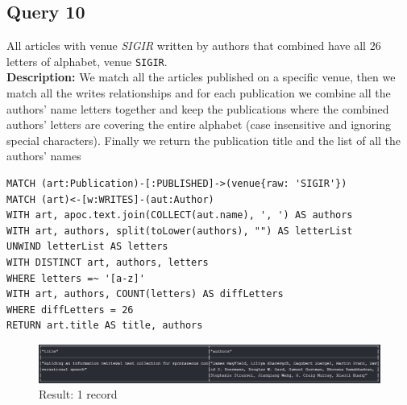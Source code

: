 \documentclass{Configuration_Files/PoliMi3i_thesis}
\begin{document}
\subsection{Query 10}
All articles with venue \emph{SIGIR} written by authors that combined have all 26 letters of alphabet, venue \verb |SIGIR|.\\
\textbf{Description:} We match all the articles published on a specific venue, then we match all the writes relationships
and for each publication we combine all the authors' name letters together and keep the publications where the combined
authors' letters are covering the entire alphabet (case insensitive and ignoring special characters). Finally we return
the publication title and the list of all the authors' names
\begin{lstlisting}[language=cypher, label=lst:cypher-example]
MATCH (art:Publication)-[:PUBLISHED]->(venue{raw: 'SIGIR'})
MATCH (art)<-[w:WRITES]-(aut:Author)
WITH art, apoc.text.join(COLLECT(aut.name), ', ') AS authors
WITH art, authors, split(toLower(authors), "") AS letterList
UNWIND letterList AS letters
WITH DISTINCT art, authors, letters
WHERE letters =~ '[a-z]'
WITH art, authors, COUNT(letters) AS diffLetters
WHERE diffLetters = 26
RETURN art.title AS title, authors
\end{lstlisting}
\begin{figure}[H]
\centering
\includegraphics[width=1\textwidth]{query/query10.PNG}
\caption{Result: 1 record}
\label{fig:query10}
\end{figure}
\end{document}
